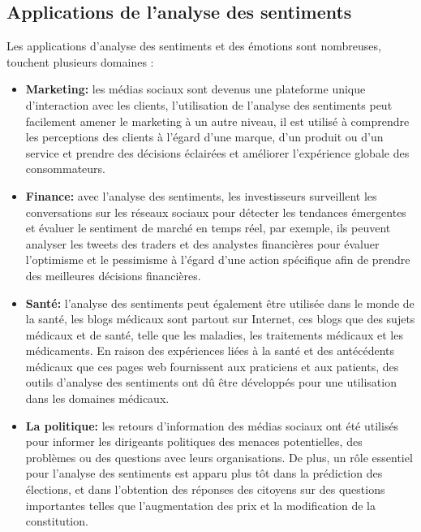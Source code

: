 \subsection{Applications de l’analyse des sentiments}
Les applications d’analyse des sentiments et des émotions sont nombreuses, touchent plusieurs domaines \cite{duwairi2014sentiment}:
\begin{itemize}
    \item \textbf{Marketing:} les médias sociaux sont devenus une plateforme unique d’interaction avec les clients, l’utilisation de l’analyse des sentiments peut facilement amener le marketing à un autre niveau, il est utilisé à comprendre les perceptions des clients à l’égard d’une marque, d’un produit ou d’un service et prendre des décisions éclairées et améliorer l'expérience globale des consommateurs.
    \item \textbf{Finance:} avec l’analyse des sentiments, les investisseurs surveillent les conversations sur les réseaux sociaux pour détecter les tendances émergentes et évaluer le sentiment de marché en temps réel, par exemple, ils peuvent analyser les tweets des traders et des analystes financières pour évaluer l’optimisme et le pessimisme à l’égard d’une action spécifique afin de prendre des meilleures décisions financières.
    \item \textbf{Santé:} l’analyse des sentiments peut également être utilisée dans le monde de la santé, les blogs médicaux sont partout sur Internet, ces blogs que des sujets médicaux et de santé, telle que les maladies, les traitements médicaux et les médicaments. En raison des expériences liées à la santé et des antécédents médicaux que ces pages web fournissent aux praticiens et aux patients, des outils d'analyse des sentiments ont dû être développés pour une utilisation dans les domaines médicaux.
    \item \textbf{La politique: }les retours d'information des médias sociaux ont été utilisés pour informer les dirigeants politiques des menaces potentielles, des problèmes ou des questions avec leurs organisations. De plus, un rôle essentiel pour l'analyse des sentiments est apparu plus tôt dans la prédiction des élections, et dans l'obtention des réponses des citoyens sur des questions importantes telles que l'augmentation des prix et la modification de la constitution.
\end{itemize}









